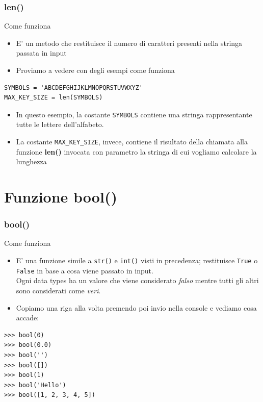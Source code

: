 \documentclass{beamer}
\begin{document}
\begin{frame}[fragile]
\frametitle{len()}
\begin{block}{Come funziona}
	\begin{itemize}
		\item E' un metodo che restituisce il numero di caratteri presenti nella stringa passata in input
		\item Proviamo a vedere con degli esempi come funziona
	\end{itemize}

	\begin{lstlisting}
SYMBOLS = 'ABCDEFGHIJKLMNOPQRSTUVWXYZ'
MAX_KEY_SIZE = len(SYMBOLS)
	\end{lstlisting}	
	\begin{itemize}
		\item In questo esempio, la costante \texttt{SYMBOLS} contiene una stringa rappresentante tutte le lettere dell'alfabeto.
		\item La costante \texttt{MAX\_KEY\_SIZE}, invece, contiene il risultato della chiamata alla funzione \textbf{len()} invocata con parametro la stringa di cui vogliamo calcolare la lunghezza
	\end{itemize}
\end{block}
\end{frame}

\section{Funzione bool()}

\begin{frame}[fragile]
\frametitle{bool()}
\begin{block}{Come funziona}
	\begin{itemize}
		\item E' una funzione simile a \texttt{str()} e \texttt{int()} visti in precedenza; restituisce \texttt{True} o \texttt{False} in base a cosa viene passato in input. \\ Ogni data types ha un valore che viene considerato \textit{falso} mentre tutti gli altri sono considerati come \textit{veri}.
		\item Copiamo una riga alla volta premendo poi invio nella console e vediamo cosa accade:
	\end{itemize}
\end{block}
\begin{lstlisting}
>>> bool(0)
>>> bool(0.0)
>>> bool('')
>>> bool([])
>>> bool(1)
>>> bool('Hello')
>>> bool([1, 2, 3, 4, 5])
\end{lstlisting}
\end{frame}
\end{document}
